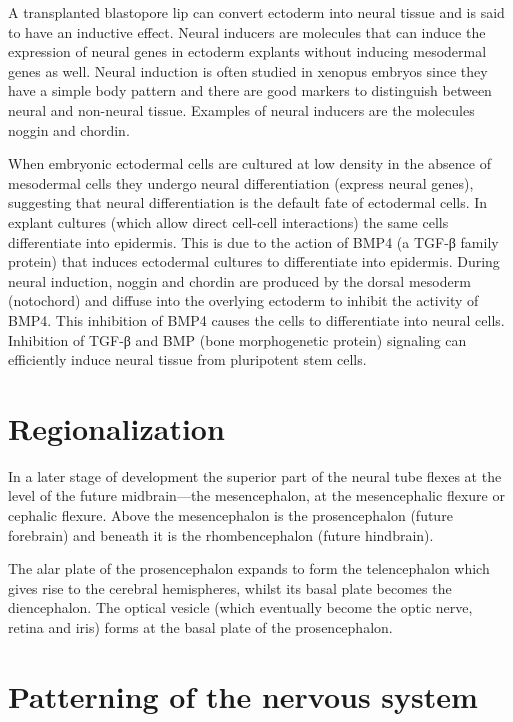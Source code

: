 \documentclass[]{book}
\begin{document}
A transplanted blastopore lip can convert ectoderm into neural tissue and is said to have an inductive effect. Neural inducers are molecules that can induce the expression of neural genes in ectoderm explants without inducing mesodermal genes as well. Neural induction is often studied in xenopus embryos since they have a simple body pattern and there are good markers to distinguish between neural and non-neural tissue. Examples of neural inducers are the molecules noggin and chordin.

When embryonic ectodermal cells are cultured at low density in the absence of mesodermal cells they undergo neural differentiation (express neural genes), suggesting that neural differentiation is the default fate of ectodermal cells. In explant cultures (which allow direct cell-cell interactions) the same cells differentiate into epidermis. This is due to the action of BMP4 (a TGF-β family protein) that induces ectodermal cultures to differentiate into epidermis. During neural induction, noggin and chordin are produced by the dorsal mesoderm (notochord) and diffuse into the overlying ectoderm to inhibit the activity of BMP4. This inhibition of BMP4 causes the cells to differentiate into neural cells. Inhibition of TGF-β and BMP (bone morphogenetic protein) signaling can efficiently induce neural tissue from pluripotent stem cells.

\hypertarget{regionalization}{%
\section{Regionalization}\label{regionalization}}

In a later stage of development the superior part of the neural tube flexes at the level of the future midbrain---the mesencephalon, at the mesencephalic flexure or cephalic flexure. Above the mesencephalon is the prosencephalon (future forebrain) and beneath it is the rhombencephalon (future hindbrain).

The alar plate of the prosencephalon expands to form the telencephalon which gives rise to the cerebral hemispheres, whilst its basal plate becomes the diencephalon. The optical vesicle (which eventually become the optic nerve, retina and iris) forms at the basal plate of the prosencephalon.

\hypertarget{patterning-of-the-nervous-system}{%
\section{Patterning of the nervous system}\label{patterning-of-the-nervous-system}}
\end{document}
